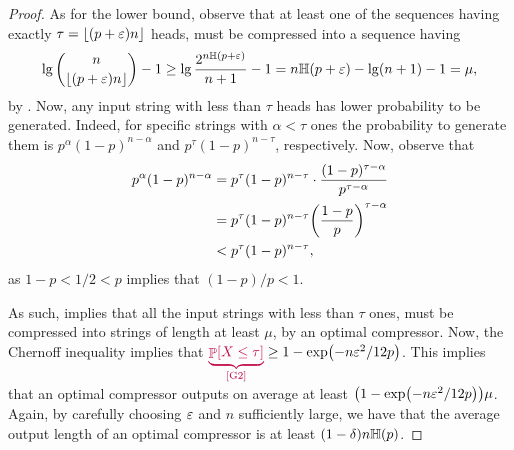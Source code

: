 \begin{proof}
    As for the lower bound, observe that at least one of the sequences
    having exactly $\tau = \left\lfloor {(p + {\varepsilon})n} \right\rfloor$ heads, must be
    compressed into a sequence having
    \begin{equation*}
    \lg \binom{n}{\floor{(p+\eps)n}} - 1 \geq \lg
    \frac{2^{n\Entropy{p+\eps}}}{n+1} - 1 = n\Entropy{p+\eps} - \lg (n+1) -
    1 = \mu,
    \end{equation*}
    by . Now, any input string with less than
    $\tau$ heads has lower probability to be generated. Indeed, for
    specific strings with $\alpha < \tau$ ones the probability to
    generate them is $p^\alpha (1-p)^{n-\alpha}$ and $p^\tau
    (1-p)^{n-\tau}$, respectively. Now, observe that
    \begin{align*}
        p^\alpha (1-p)^{n-\alpha}%
        &=%
        p^{\tau}(1-p)^{n-\tau}\cdot\frac{(1-p)^{\tau - \alpha}}{p^{\tau-\alpha}}
        \\&=%
        p^{\tau}(1-p)^{n-\tau} \pth{\frac{1-p}{p}}^{\tau-\alpha}
        \\&<%
        p^{\tau}(1-p)^{n-\tau},
    \end{align*}
    as $1-p < 1/2 < p$ implies that $(1-p)/p < 1$.

    As such,  implies that all the input strings
    with less than $\tau$ ones, must be compressed into strings of
    length at least $\mu$, by an optimal compressor. Now, the Chernoff
    inequality implies that $\markX{G2}{\Prob{X \leq \tau }} \geq 1- \exp \pth{ -
       n \eps^2 /12p } $. This implies that an optimal compressor outputs
    on average at least $\pth{1- \exp \pth{ - n \eps^2 /12p } }
    \mu$. Again, by carefully choosing ${\varepsilon}$ and $n$ sufficiently
    large, we have that the average output length of an optimal
    compressor is at least $(1-\delta)n \Entropy{p}$.
\end{proof}



